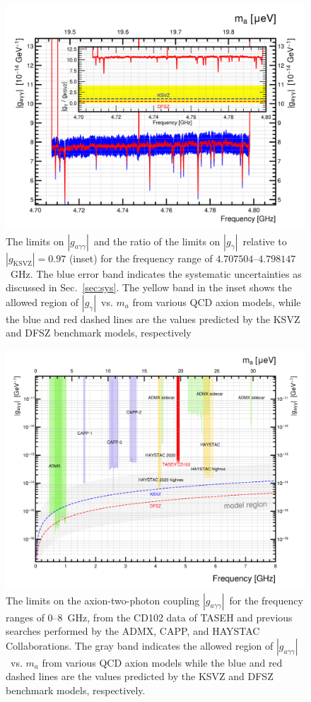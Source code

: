 \documentclass[%
 reprint,prl, %
 amsmath,amssymb,
 aps,
]{revtex4-2}
\newcommand{\gagg}{\ensuremath{\left|g_{a\gamma\gamma}\right|}}
\newcommand{\ggamma}{\ensuremath{\left|g_{\gamma}\right|}}
\newcommand{\flo}{\ensuremath{4.707504}}
\newcommand{\fhi}{\ensuremath{4.798147}}
\begin{document}
\begin{figure} [htbp]
  \centering
  \includegraphics[width=12.9cm]{figures/TASEHonly_limits.png}
  \caption{The limits on \gagg\ and the ratio of the limits on 
\ggamma\ relative to $\left|g_\text{KSVZ}\right|=0.97$ 
  (inset) for the frequency range of 
\flo--\fhi~GHz. The blue error band indicates the systematic 
  uncertainties as discussed in Sec.~\ref{sec:sys}. The yellow 
 band in the inset shows the allowed region of \ggamma\ vs. $m_a$ 
 from various QCD axion models, while the blue and red dashed lines are the 
values predicted by the KSVZ and DFSZ benchmark models, respectively}
  \label{fig:glimit}
\end{figure}


\begin{figure} [htbp]
  \centering
 \includegraphics[width=12.9cm]{figures/RealData_limit_allexp.png}
  \caption{The limits on the axion-two-photon coupling \gagg\ for the 
frequency ranges of 0--8~GHz, from the CD102 data of TASEH and previous 
searches performed by the ADMX, CAPP, and HAYSTAC Collaborations. The gray 
band indicates the allowed region of \gagg\ vs. $m_a$ from various QCD axion 
models while the blue and red dashed lines are the values predicted by the 
KSVZ and DFSZ benchmark models, respectively.}
  \label{fig:gaggall}
\end{figure}
\end{document}
